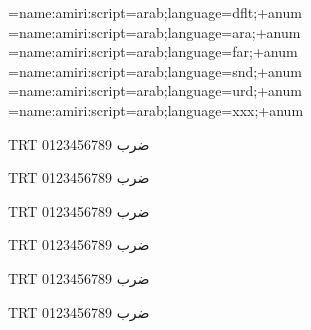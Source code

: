 

\font\testd={name:amiri:script=arab;language=dflt;+anum}
\font\testa={name:amiri:script=arab;language=ara;+anum}
\font\testp={name:amiri:script=arab;language=far;+anum}
\font\tests={name:amiri:script=arab;language=snd;+anum}
\font\testu={name:amiri:script=arab;language=urd;+anum}
\font\testx={name:amiri:script=arab;language=xxx;+anum}

\def\test{\luatextextdir TRT ضرب 0123456789}
\testd \test\par
\testa \test\par
\testp \test\par
\tests \test\par
\testu \test\par
\testx \test\par
\bye
